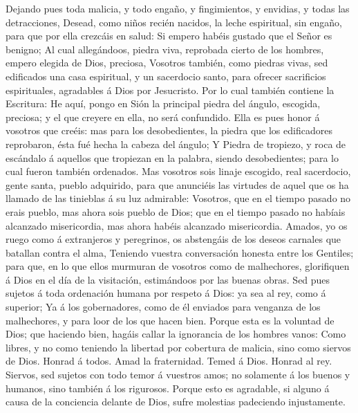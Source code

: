  Dejando pues toda malicia, y todo engaño, y fingimientos, y
envidias, y todas las detracciones,  Desead, como niños
recién nacidos, la leche espiritual, sin engaño, para que por ella
crezcáis en salud:  Si empero habéis gustado que el Señor es
benigno;  Al cual allegándoos, piedra viva, reprobada cierto
de los hombres, empero elegida de Dios, preciosa,  Vosotros
también, como piedras vivas, sed edificados una casa espiritual, y un
sacerdocio santo, para ofrecer sacrificios espirituales, agradables á
Dios por Jesucristo.  Por lo cual también contiene la
Escritura: He aquí, pongo en Sión la principal piedra del ángulo,
escogida, preciosa; y el que creyere en ella, no será confundido.
 Ella es pues honor á vosotros que creéis: mas para los
desobedientes, la piedra que los edificadores reprobaron, ésta fué hecha
la cabeza del ángulo;  Y Piedra de tropiezo, y roca de
escándalo á aquellos que tropiezan en la palabra, siendo desobedientes;
para lo cual fueron también ordenados.  Mas vosotros sois
linaje escogido, real sacerdocio, gente santa, pueblo adquirido, para
que anunciéis las virtudes de aquel que os ha llamado de las tinieblas á
su luz admirable:  Vosotros, que en el tiempo pasado no
erais pueblo, mas ahora sois pueblo de Dios; que en el tiempo pasado no
habíais alcanzado misericordia, mas ahora habéis alcanzado misericordia.
 Amados, yo os ruego como á extranjeros y peregrinos, os
abstengáis de los deseos carnales que batallan contra el alma,
 Teniendo vuestra conversación honesta entre los Gentiles;
para que, en lo que ellos murmuran de vosotros como de malhechores,
glorifiquen á Dios en el día de la visitación, estimándoos por las
buenas obras.  Sed pues sujetos á toda ordenación humana
por respeto á Dios: ya sea al rey, como á superior;  Ya á
los gobernadores, como de él enviados para venganza de los malhechores,
y para loor de los que hacen bien.  Porque esta es la
voluntad de Dios; que haciendo bien, hagáis callar la ignorancia de los
hombres vanos:  Como libres, y no como teniendo la libertad
por cobertura de malicia, sino como siervos de Dios. 
Honrad á todos. Amad la fraternidad. Temed á Dios. Honrad al rey.
 Siervos, sed sujetos con todo temor á vuestros amos; no
solamente á los buenos y humanos, sino también á los rigurosos.
 Porque esto es agradable, si alguno á causa de la
conciencia delante de Dios, sufre molestias padeciendo injustamente.
